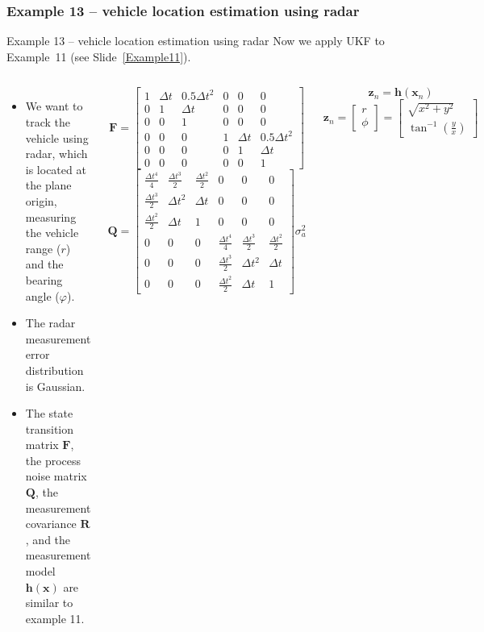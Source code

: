 \subsubsection{Example 13 – vehicle location estimation using radar}
\begin{frame}{Example 13 – vehicle location estimation using radar}
Now we apply UKF to Example~11 (see Slide~\ref{Example11}).
\begin{columns}
        \begin{itemize}
    \item We want to track the vehicle using radar, which is located at the plane origin, measuring the vehicle range ($r$) and the bearing angle ($\varphi$).
    \item The radar measurement error distribution is Gaussian. 
    \item The state transition matrix $\mathbf{F}$, the process noise matrix $\mathbf{Q}$, the measurement covariance
$\mathbf{R}$, and the measurement model $\mathbf{h}(\mathbf{x})$ are similar to example 11. 
\end{itemize}
\[
\mathbf{F} =
\begin{bmatrix}
1 & \Delta t & 0.5\Delta t^2 & 0 & 0 & 0 \\
0 & 1 & \Delta t & 0 & 0 & 0 \\
0 & 0 & 1 & 0 & 0 & 0 \\
0 & 0 & 0 & 1 & \Delta t & 0.5\Delta t^2 \\
0 & 0 & 0 & 0 & 1 & \Delta t \\
0 & 0 & 0 & 0 & 0 & 1
\end{bmatrix}
\]
        \[
\mathbf{Q} =
\begin{bmatrix}
\frac{\Delta t^4}{4} & \frac{\Delta t^3}{2} & \frac{\Delta t^2}{2} & 0 & 0 & 0 \\
\frac{\Delta t^3}{2} & \Delta t^2 & \Delta t & 0 & 0 & 0 \\
\frac{\Delta t^2}{2} & \Delta t & 1 & 0 & 0 & 0 \\
0 & 0 & 0 & \frac{\Delta t^4}{4} & \frac{\Delta t^3}{2} & \frac{\Delta t^2}{2} \\
0 & 0 & 0 & \frac{\Delta t^3}{2} & \Delta t^2 & \Delta t \\
0 & 0 & 0 & \frac{\Delta t^2}{2} & \Delta t & 1
\end{bmatrix}
\sigma^2_a
\]

\[
\mathbf{z}_n = \mathbf{h}(\mathbf{x}_n)
\]
\[
\mathbf{z}_n = 
\begin{bmatrix}
r \\
\phi
\end{bmatrix}
=
\begin{bmatrix}
\sqrt{x^2 + y^2} \\
\tan^{-1} \left(\frac{y}{x}\right)
\end{bmatrix}
\]


\end{columns}
\end{frame}
